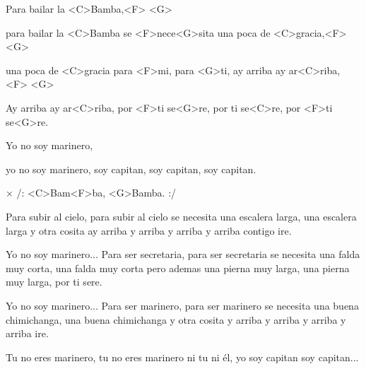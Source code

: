 
\zs
Para bailar la <C>Bamba,<F> <G> 

para bailar la <C>Bamba se <F>nece<G>sita
una poca de <C>gracia,<F> <G> 

una poca de <C>gracia para <F>mi, para <G>ti,
ay arriba ay ar<C>riba, <F> <G>

Ay arriba ay ar<C>riba, por <F>ti se<G>re,
por ti se<C>re, por <F>ti se<G>re.

Yo no soy marinero,

yo no soy marinero, soy capitan,
soy capitan, soy capitan.
\ks

× /: <C>Bam<F>ba, <G>Bamba. :/
\kr

\zs
Para subir al cielo,
para subir al cielo se necesita una escalera larga,
una escalera larga y otra cosita ay arriba y arriba
y arriba y arriba contigo ire.

Yo no soy marinero...
\ks
\zr \kr
\zs
Para ser secretaria,
para ser secretaria se necesita una falda muy corta,
una falda muy corta pero ademas una pierna muy larga,
una pierna muy larga, por ti sere.

Yo no soy marinero...
\ks
\zs
Para ser marinero,
para ser marinero se necesita una buena chimichanga,
una buena chimichanga y otra cosita y arriba y arriba
y arriba y arriba ire.

Tu no eres marinero, tu no eres marinero ni tu ni él,
yo soy capitan soy capitan...
\ks
\kp
